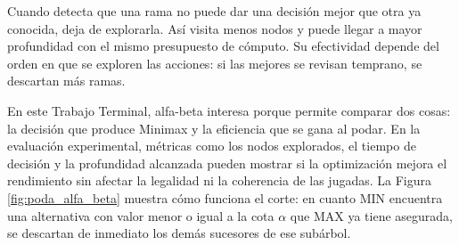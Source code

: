 Cuando detecta que una rama no puede dar una decisión mejor que otra ya conocida, deja de explorarla. Así visita menos nodos y puede llegar a mayor profundidad con el mismo presupuesto de cómputo. Su efectividad depende del orden en que se exploren las acciones: si las mejores se revisan temprano, se descartan más ramas.

En este Trabajo Terminal, alfa-beta interesa porque permite comparar dos cosas: la decisión que produce Minimax y la eficiencia que se gana al podar. En la evaluación experimental, métricas como los nodos explorados, el tiempo de decisión y la profundidad alcanzada pueden mostrar si la optimización mejora el rendimiento sin afectar la legalidad ni la coherencia de las jugadas. La Figura \ref{fig:poda_alfa_beta} muestra cómo funciona el corte: en cuanto MIN encuentra una alternativa con valor menor o igual a la cota $\alpha$ que MAX ya tiene asegurada, se descartan de inmediato los demás sucesores de ese subárbol.

